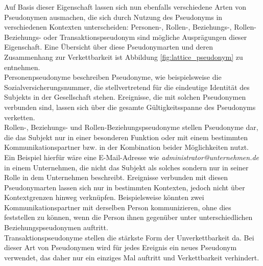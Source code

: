 Auf Basis dieser Eigenschaft lassen sich nun ebenfalls verschiedene Arten von Pseudonymen ausmachen, die sich durch Nutzung des Pseudonyms in verschiedenen Kontexten unterscheiden: Personen-, Rollen-, Beziehungs-, Rollen-Beziehungs- oder Transaktionspseudonym sind mögliche Ausprägungen dieser Eigenschaft. Eine Übersicht über diese Pseudonymarten und deren Zusammenhang zur Verkettbarkeit ist Abbildung \ref{fig:lattice_pseudonym} zu entnehmen.\\
Personenpseudonyme beschreiben Pseudonyme, wie beispielsweise die Sozialversicherungsnummer, die stellvertretend für die eindeutige Identität des Subjekts in der Gesellschaft stehen. Ereignisse, die mit solchen Pseudonymen verbunden sind, lassen sich über die gesamte Gültigkeitsspanne des Pseudonyms verketten. \\
Rollen-, Beziehungs- und Rollen-Beziehungspseudonyme stellen Pseudonyme dar, die das Subjekt nur in einer besonderen Funktion oder mit einem bestimmten Kommunikationspartner bzw. in der Kombination beider Möglichkeiten nutzt. Ein Beispiel hierfür wäre eine E-Mail-Adresse wie \textit{administrator@unternehmen.de} in einem Unternehmen, die nicht das Subjekt als solches sondern nur in seiner Rolle in dem Unternehmen beschreibt. Ereignisse verbunden mit diesen Pseudonymarten lassen sich nur in bestimmten Kontexten, jedoch nicht über Kontextgrenzen hinweg verknüpfen. Beispielsweise könnten zwei Kommunikationspartner mit derselben Person kommunizieren, ohne dies feststellen zu können, wenn die Person ihnen gegenüber unter unterschiedlichen Beziehungspseudonymen auftritt.\\
Transaktionspseudonyme stellen die stärkste Form der Unverkettbarkeit da. Bei dieser Art von Pseudonymen wird für jedes Ereignis ein neues Pseudonym verwendet, das daher nur ein einziges Mal auftritt und Verkettbarkeit verhindert.


